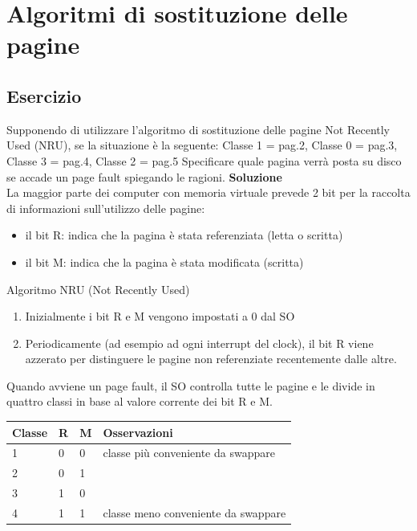 \documentclass{article}
\begin{document}
\section{Algoritmi di sostituzione delle pagine}
\subsection{Esercizio}

Supponendo di utilizzare l’algoritmo di sostituzione delle
pagine Not Recently Used (NRU), se la situazione è la seguente:
Classe 1 = pag.2, Classe 0 = pag.3, Classe 3 = pag.4, Classe 2 = pag.5
Specificare quale pagina verrà posta su disco se accade un page fault
spiegando le ragioni.
\vskip 0.5cm
\textbf{Soluzione}\\
La maggior parte dei computer con memoria virtuale prevede 2 bit per la raccolta di informazioni sull'utilizzo delle pagine:
\begin{itemize}
\item  il bit R: indica che la pagina è stata referenziata (letta o scritta)
\item  il bit M: indica che la pagina è stata modificata (scritta)
\end{itemize}

Algoritmo NRU (Not Recently Used)

\begin{enumerate}
\item  Inizialmente i bit R e M vengono impostati a 0 dal SO
\item  Periodicamente (ad esempio ad ogni interrupt del clock), il bit R viene azzerato per distinguere le pagine non referenziate recentemente dalle altre.
\end{enumerate}
Quando avviene un page fault, il SO controlla tutte le pagine e le divide in quattro classi in base al valore corrente dei bit R e M.

\vskip 0.5cm

 \begin{tabular}{|p{}|p{}|p{}|p{}|}
\hline
Classe         & R        & M          & Osservazioni \\
\hline
1            & 0     & 0               & classe più conveniente da swappare  \\
2            & 0     & 1                 &  \\
3            & 1     & 0                 & \\
4            & 1     & 1                &   classe meno conveniente da swappare \\
\hline
\end{tabular}
\end{document}
